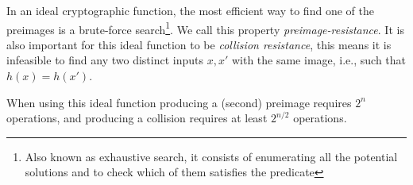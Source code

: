 In an ideal cryptographic function, the most efficient way to find one of the
  preimages is a brute-force search\footnote{Also known as exhaustive search,
  it consists of enumerating all the potential solutions and to check which of
  them satisfies the predicate}. We call this property
  \textit{preimage-resistance}.
It is also important for this ideal function to be \textit{collision
  resistance}, this means it is infeasible to find any two distinct inputs
  $x, x'$ with the same image, i.e., such that $h(x) = h(x')$.

When using this ideal function producing a (second) preimage requires $2^n$
  operations, and producing a collision requires at least
  $2^{n / 2} $ operations\cite{preneel1993analysis}.
